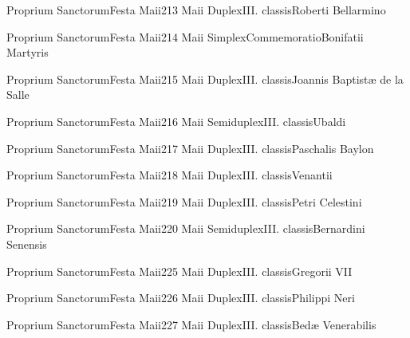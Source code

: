 \documentclass[invitatoriale-romanum.tex]{subfiles}
\begin{document}
	{Proprium Sanctorum}{Festa Maii}{2}{13 Maii}
	{Duplex}{III. classis}{Roberti Bellarmino}
	{}
	{}

	{Proprium Sanctorum}{Festa Maii}{2}{14 Maii}
	{Simplex}{Commemoratio}{Bonifatii Martyris}
	{}
	{\invitferia}

	{Proprium Sanctorum}{Festa Maii}{2}{15 Maii}
	{Duplex}{III. classis}{Joannis Baptistæ de la Salle}
	{}
	{}

	{Proprium Sanctorum}{Festa Maii}{2}{16 Maii}
	{Semiduplex}{III. classis}{Ubaldi}
	{}
	{}

	{Proprium Sanctorum}{Festa Maii}{2}{17 Maii}
	{Duplex}{III. classis}{Paschalis Baylon}
	{}
	{}

	{Proprium Sanctorum}{Festa Maii}{2}{18 Maii}
	{Duplex}{III. classis}{Venantii}
	{}
	{}

	{Proprium Sanctorum}{Festa Maii}{2}{19 Maii}
	{Duplex}{III. classis}{Petri Celestini}
	{}
	{}

	{Proprium Sanctorum}{Festa Maii}{2}{20 Maii}
	{Semiduplex}{III. classis}{Bernardini Senensis}
	{}
	{}

	{Proprium Sanctorum}{Festa Maii}{2}{25 Maii}
	{Duplex}{III. classis}{Gregorii VII}
	{}
	{}

	{Proprium Sanctorum}{Festa Maii}{2}{26 Maii}
	{Duplex}{III. classis}{Philippi Neri}
	{}
	{}

	{Proprium Sanctorum}{Festa Maii}{2}{27 Maii}
	{Duplex}{III. classis}{Bedæ Venerabilis}
	{}
	{}
\end{document}
